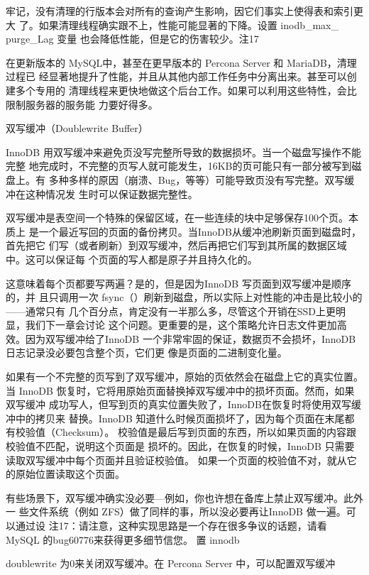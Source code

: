 牢记，没有清理的行版本会对所有的查询产生影响，因它们事实上使得表和索引更大
了。如果清理线程确实跟不上，性能可能显著的下降。设置 inodb\_max\_ purge\_Lag 变量
也会降低性能，但是它的伤害较少。注17

在更新版本的 MySQL中，甚至在更早版本的 Percona Server 和 MariaDB，清理过程已
经显著地提升了性能，并且从其他内部工作任务中分离出来。甚至可以创建多个专用的
清理线程来更快地做这个后台工作。如果可以利用这些特性，会比限制服务器的服务能
力要好得多。

双写缓冲（Doublewrite Buffer）

InnoDB 用双写缓冲来避免页没写完整所导致的数据损坏。当一个磁盘写操作不能完整
地完成时，不完整的页写人就可能发生，16KB的页可能只有一部分被写到磁盘上。有
多种多样的原因（崩溃、Bug，等等）可能导致页没有写完整。双写缓冲在这种情况发
生时可以保证数据完整性。

双写缓冲是表空间一个特殊的保留区域，在一些连续的块中足够保存100个页。本质上
是一个最近写回的页面的备份拷贝。当InnoDB从缓冲池刷新页面到磁盘时，首先把它
们写（或者刷新）到双写缓冲，然后再把它们写到其所属的数据区域中。这可以保证每
个页面的写人都是原子并且持久化的。

这意味着每个页都要写两遍？是的，但是因为InnoDB 写页面到双写缓冲是顺序的，并
且只调用一次 fsync（）刷新到磁盘，所以实际上对性能的冲击是比较小的——通常只有
几个百分点，肯定没有一半那么多，尽管这个开销在SSD上更明显，我们下一章会讨论
这个问题。更重要的是，这个策略允许日志文件更加高效。因为双写缓冲给了InnoDB
一个非常牢固的保证，数据页不会损坏，InnoDB日志记录没必要包含整个页，它们更
像是页面的二进制变化量。

如果有一个不完整的页写到了双写缓冲，原始的页依然会在磁盘上它的真实位置。当
InnoDB 恢复时，它将用原始页面替换掉双写缓冲中的损坏页面。然而，如果双写缓冲
成功写人，但写到页的真实位置失败了，InnoDB在恢复时将使用双写缓冲中的拷贝来
替换。InnoDB 知道什么时候页面损坏了，因为每个页面在末尾都有校验值（Checksum）。
校验值是最后写到页面的东西，所以如果页面的内容跟校验值不匹配，说明这个页面是
损坏的。因此，在恢复的时候，InnoDB 只需要读取双写缓冲中每个页面并且验证校验值。
如果一个页面的校验值不对，就从它的原始位置读取这个页面。

有些场景下，双写缓冲确实没必要—例如，你也许想在备库上禁止双写缓冲。此外一
些文件系统（例如 ZFS）做了同样的事，所以没必要再让InnoDB 做一遍。可以通过设
注17：请注意，这种实现思路是一个存在很多争议的话题，请看 MySQL 的bug60776来获得更多细节信您。
置 innodb

doublewrite 为0来关闭双写缓冲。在 Percona Server 中，可以配置双写缓冲

